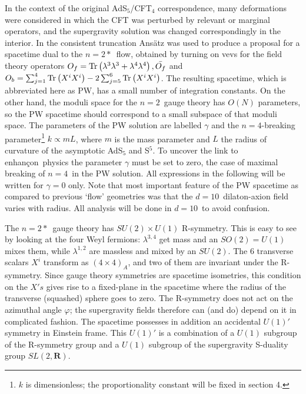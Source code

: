 \documentclass[a4paper,12pt]{amsproc}
\numberwithin{equation}{section}
\def\enh{enhan\c con}
\def\nef{$n{=}4$}
\def\net{$n{=}2$}
\def\nets{$n{=}2*$}
\def\detn{$d{=}10$}
\def\bR{\mathbf{R}}
\begin{document}
In the context of the original AdS$_5$/CFT$_4$ correspondence, many
deformations were considered in which the CFT was perturbed by
relevant or marginal operators, and the supergravity solution was
changed correspondingly in the interior.  In \cite{pilwar} the
consistent truncation Ans{\"a}tz was used to produce a proposal for a
spacetime dual to the \nets\ flow, obtained by turning on vevs for the
field theory operators
%
$O_f = {\rm{Tr}}\left( \lambda^3\lambda^3+\lambda^4\lambda^4\right),
{\bar{O_f}}$
%
and
%
$O_b =  \sum_{j=1}^4 {\rm{Tr}}\left( X^i X^i\right)
    - 2\sum_{j=5}^6 {\rm{Tr}}\left( X^i X^i\right)$.
%
The resulting spacetime, which is abbreviated here as PW, has a small
number of integration constants.  On the other hand, the moduli space
for the \net\ gauge theory has $O(N)$ parameters, so the PW spacetime
should correspond to a small subspace of that moduli space.  The
parameters of the PW solution are labelled $\gamma$ and the
\nef-breaking parameter\footnote{$k$ is dimensionless; the
proportionality constant will be fixed in section 4.}  $k\propto mL$,
where $m$ is the mass parameter and $L$ the radius of curvature of the
asymptotic AdS$_5$ and S$^5$.  To uncover the link to \enh\ physics
the parameter $\gamma$ must be set to zero, the case of maximal
breaking of \nef\ in the PW solution.  All expressions in the
following will be written for $\gamma=0$ only.  Note that most
important feature of the PW spacetime as compared to previous `flow'
geometries was that the \detn\ dilaton-axion field varies with radius.
All analysis will be done in \detn\ to avoid confusion.

The \nets\ gauge theory has $SU(2)\times U(1)$ R-symmetry.  This is
easy to see by looking at the four Weyl fermions: $\lambda^{3,4}$ get
mass and an $SO(2)=U(1)$ mixes them, while $\lambda^{1,2}$ are
massless and mixed by an $SU(2)$.  The 6 transverse scalars $X^i$
transform as $(4\times 4)_A$, and two of them are invariant under the
R-symmetry.  Since gauge theory symmetries are spacetime isometries,
this condition on the $X's$ gives rise to a fixed-plane in the
spacetime where the radius of the transverse (squashed) sphere goes to
zero.  The R-symmetry does not act on the azimuthal angle $\varphi$;
the supergravity fields therefore can (and do) depend on it in
complicated fashion.  The spacetime possesses in addition an
accidental $U(1)'$ symmetry in Einstein frame.  This $U(1)'$ is a
combination of a $U(1)$ subgroup of the R-symmetry group and a $U(1)$
subgroup of the supergravity S-duality group $SL(2,\bR)$.
\end{document}
